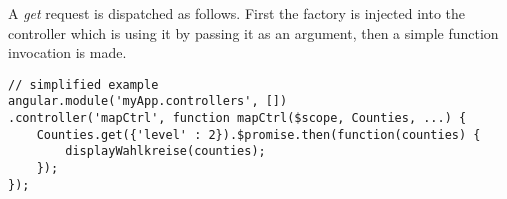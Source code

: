 A \emph{get} request is dispatched as follows. First the factory is
injected into the controller which is using it by passing it as an
argument, then a simple function invocation is made.



\begin{lstlisting}
// simplified example
angular.module('myApp.controllers', [])
.controller('mapCtrl', function mapCtrl($scope, Counties, ...) {
	Counties.get({'level' : 2}).$promise.then(function(counties) {
		displayWahlkreise(counties);
	});
});
\end{lstlisting}


